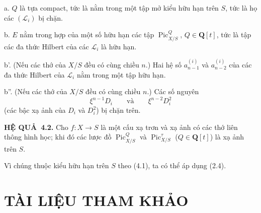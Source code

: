 \documentclass[11pt,twoside,openany]{book}
\numberwithin{equation}{section}
\newcommand{\src}[1]{%
  \phantomsection\hypertarget{src:\fgasourceid:#1}{}%
  \marginpar{\raggedleft\footnotesize\sffamily #1}%
}
\newcommand{\fgasourceid}{unset}
\newcommand{\result}[2]{\par\medskip\noindent\textbf{#1\if\relax\detokenize{#2}\relax\else\ #2\fi.}\quad}
\begin{document}
\noindent a. $Q$ là tựa
compact, tức là nằm trong một tập mở kiểu hữu hạn trên $S$, tức là họ các
$(\mathcal L_i)$ bị chặn.

\noindent b. $E$ nằm trong hợp của một số hữu hạn các tập
$\operatorname{Pic}_{X/S}^Q$, $Q\in\mathbf Q[t]$, tức là tập các đa thức
Hilbert của các $\mathcal L_i$ là hữu hạn.

\noindent b'. (Nếu các thớ của $X/S$ đều có cùng chiều $n$.) Hai hệ số
$a_{n-1}^{(i)}$ và $a_{n-2}^{(i)}$ của các đa thức Hilbert của
$\mathcal L_i$ nằm trong một tập hữu hạn.
\src{243}
\noindent b''. (Nếu các thớ của $X/S$ đều có cùng chiều $n$.) Các số nguyên
\[
\xi^{n-1}D_i\qquad\text{và}\qquad\xi^{n-2}D_i^2
\]
(các bậc xạ ảnh của $D_i$ và $D_i^2$) bị chặn trên.

\result{HỆ QUẢ}{4.2} Cho $f:X\longrightarrow S$ là một cấu xạ trơn và xạ ảnh
có các thớ liên thông hình học; khi đó các lược đồ
$\operatorname{Pic}_{X/S}^Q$ và $\operatorname{Pic}_{X/S}^\tau$
($Q\in\mathbf Q[t]$) là xạ ảnh trên $S$.

Vì chúng thuộc kiểu hữu hạn trên $S$ theo (4.1), ta có thể áp dụng (2.4).

\section*{TÀI LIỆU THAM KHẢO}
\end{document}
